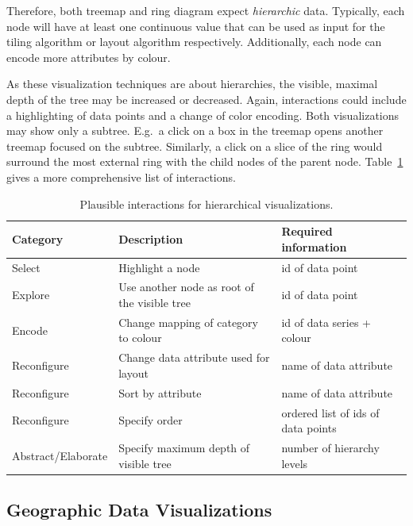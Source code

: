 Therefore, both treemap and ring diagram expect \emph{hierarchic} data.
Typically, each node will have at least one continuous value that can be used as input for the tiling algorithm or layout algorithm respectively.
Additionally, each node can encode more attributes by colour.

As these visualization techniques are about hierarchies, the visible, maximal depth of the tree may be increased or decreased.
Again, interactions could include a highlighting of data points and a change of color encoding.
Both visualizations may show only a subtree.
E.g.\ a click on a box in the treemap opens another treemap focused on the subtree.
Similarly, a click on a slice of the ring would surround the most external ring with the child nodes of the parent node.
Table~\ref{tab:analysis:hierarchies:interactions} gives a more comprehensive list of interactions.


\begin{table}[H]
  \caption{Plausible interactions for hierarchical visualizations.}%
  \label{tab:analysis:hierarchies:interactions}
  \begin{tabularx}{\linewidth}{lXX}
    \bf Category & \bf Description & \bf Required information \\
    \hline
    Select & Highlight a node & id of data point \\
    Explore & Use another node as root of the visible tree & id of data point \\
    Encode & Change mapping of category to colour & id of data series + colour \\
    Reconfigure & Change data attribute used for layout & name of data attribute \\
    Reconfigure & Sort by attribute & name of data attribute \\
    Reconfigure & Specify order & ordered list of ids of data points \\
    Abstract/Elaborate & Specify maximum depth of visible tree & number of hierarchy levels \\
  \end{tabularx}
\end{table}

\subsection{Geographic Data Visualizations}

